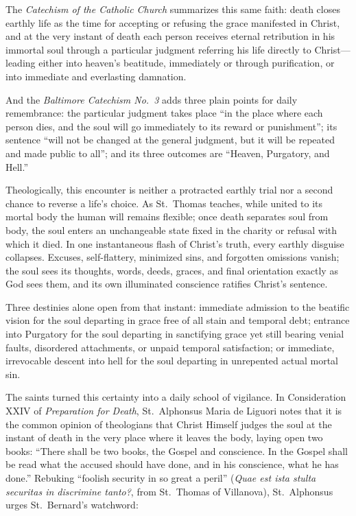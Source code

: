 The \textit{Catechism of the Catholic Church} summarizes this same faith: death closes earthly life as the time for accepting or refusing the grace manifested in Christ, and at the very instant of death each person receives eternal retribution in his immortal soul through a particular judgment referring his life directly to Christ---leading either into heaven's beatitude, immediately or through purification, or into immediate and everlasting damnation.

And the \textit{Baltimore Catechism No.\ 3} adds three plain points for daily remembrance: the particular judgment takes place ``in the place where each person dies, and the soul will go immediately to its reward or punishment''; its sentence ``will not be changed at the general judgment, but it will be repeated and made public to all''; and its three outcomes are ``Heaven, Purgatory, and Hell.''

Theologically, this encounter is neither a protracted earthly trial nor a second chance to reverse a life's choice. As St.\ Thomas teaches, while united to its mortal body the human will remains flexible; once death separates soul from body, the soul enters an unchangeable state fixed in the charity or refusal with which it died. In one instantaneous flash of Christ's truth, every earthly disguise collapses. Excuses, self-flattery, minimized sins, and forgotten omissions vanish; the soul sees its thoughts, words, deeds, graces, and final orientation exactly as God sees them, and its own illuminated conscience ratifies Christ's sentence.

Three destinies alone open from that instant: immediate admission to the beatific vision for the soul departing in grace free of all stain and temporal debt; entrance into Purgatory for the soul departing in sanctifying grace yet still bearing venial faults, disordered attachments, or unpaid temporal satisfaction; or immediate, irrevocable descent into hell for the soul departing in unrepented actual mortal sin.

The saints turned this certainty into a daily school of vigilance. In Consideration XXIV of \textit{Preparation for Death}, St.\ Alphonsus Maria de Liguori notes that it is the common opinion of theologians that Christ Himself judges the soul at the instant of death in the very place where it leaves the body, laying open two books: ``There shall be two books, the Gospel and conscience. In the Gospel shall be read what the accused should have done, and in his conscience, what he has done.'' Rebuking ``foolish security in so great a peril'' (\textit{Quae est ista stulta securitas in discrimine tanto?}, from St.\ Thomas of Villanova), St.\ Alphonsus urges St.\ Bernard's watchword:

